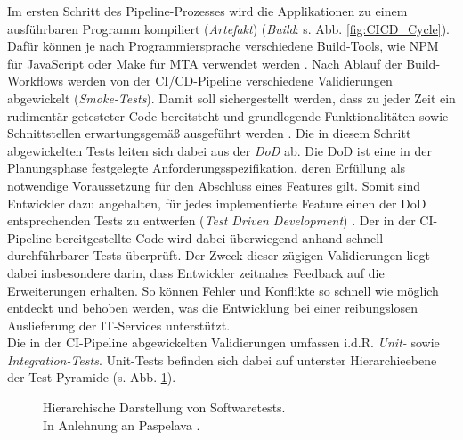 Im ersten Schritt des Pipeline-Prozesses wird die Applikationen zu einem ausführ\-baren Programm kompiliert (\textit{Artefakt}) (\textit{Build}: s. Abb. \ref{fig:CICD_Cycle}). Dafür können je nach Programmiersprache verschiedene Build-Tools, wie NPM für JavaScript oder Make für \ac{MTA} verwendet werden \cite[737]{Lange.2023}. Nach Ablauf der Build-Workflows werden von der CI/CD-Pipeline verschiedene Validierungen abgewickelt (\textit{Smoke-Tests}). Damit soll sichergestellt werden, dass zu jeder Zeit ein rudimentär getesteter Code bereitsteht und grundlegende Funktionalitäten sowie Schnittstellen erwartungsgemäß ausgeführt werden \cite[19]{Halstenberg.2020}. Die in diesem Schritt abgewickelten Tests leiten sich dabei aus der \textit{\ac{DoD}} ab. Die DoD ist eine in der Planungsphase festgelegte Anforderungsspezifikation, deren Erfüllung als notwendige Voraussetzung für den Abschluss eines Features gilt. Somit sind Entwickler dazu angehalten, für jedes implementierte Feature einen der DoD entsprechenden Tests zu entwerfen (\textit{Test Driven Development}) \cite{.20230419}. Der in der CI-Pipeline bereitgestellte Code wird dabei überwiegend anhand schnell durchführbarer Tests überprüft. Der Zweck dieser zügigen Validierungen liegt dabei insbesondere darin, dass Entwickler zeitnahes Feedback auf die Erweiterungen erhalten. So können Fehler und Konflikte so schnell wie möglich entdeckt und behoben werden, was die Entwicklung bei einer reibungslosen Auslieferung der IT-Services unterstützt.\\ Die in der CI-Pipeline abgewickelten Validierungen umfassen i.d.R. \textit{Unit-} sowie \textit{Integration-Tests}. Unit-Tests befinden sich dabei auf unterster Hierarchieebene der Test-Pyramide (s. Abb. \ref{fig:Tests}).
\begin{center}
	\begin{figure}[H]
		\centering
		\caption[Hierarchische Darstellung von Softwaretests]{Hierarchische Darstellung von Softwaretests.\\ \hspace{0.5cm}In Anlehnung an Paspelava \cite{Exposit.2021}.}
		\label{fig:Tests}
	\end{figure}
\end{center}
\vspace*{-15mm}
